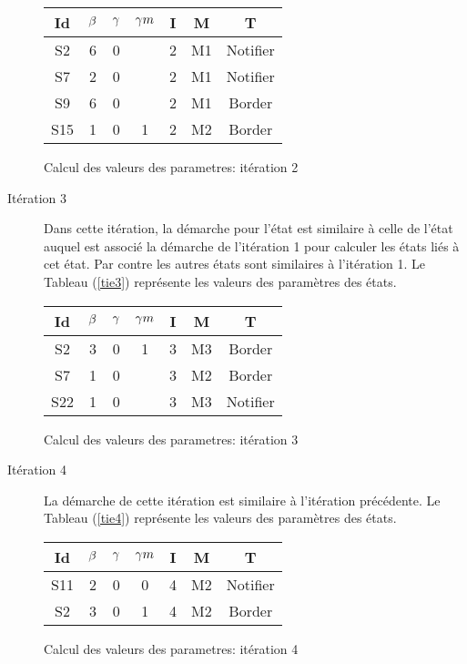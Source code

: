 \begin{Exemple}
\begin{description}
\begin{tableth}
\begin{tabular}{|*{7}{c|}}
		\hline
		Id&$\beta{}$&	$\gamma{}$	&$\gamma m{}$ &	I&	M&	T\\ \hline
		S2&		6&	0&	&	2&	M1&	Notifier\\ \hline
		S7&		2&	0&	&	2&	M1&	Notifier\\ \hline
		S9&		6&	0&	&	2&	M1&	Border\\ \hline
		S15&	1&	0&	1&	2&	M2&	Border\\ \hline		
	\end{tabular}
	\caption{Calcul des valeurs des parametres: itération 2}\label{tie2}
\end{tableth}
\item[Itération 3] Dans cette itération, la démarche pour l'état  est similaire à celle de l'état  auquel est associé la démarche de l'itération 1 pour calculer les états liés à cet état. Par contre les autres états sont similaires à l'itération 1. Le Tableau (\ref{tie3}) représente les valeurs des paramètres  des états. 
\begin{tableth}
	\centering
	\begin{tabular}{|*{7}{c|}}
		\hline
		Id&$\beta{}$&	$\gamma{}$	&$\gamma m{}$ &	I&	M&	T\\ \hline
		S2&		3&	0&	1&	3&	M3&	Border\\ \hline
		S7&		1&	0&	&	3&	M2&	Border\\ \hline
		S22&	1&	0&	&	3&	M3&	Notifier\\ \hline	
	\end{tabular}
	\caption{Calcul des valeurs des parametres: itération 3}\label{tie3}
\end{tableth}

\item[Itération 4] La démarche de cette itération est similaire à l'itération précédente. Le Tableau (\ref{tie4}) représente les valeurs des paramètres  des états.  
\begin{tableth}
	\centering
	\begin{tabular}{|*{7}{c|}}
		\hline
		Id&$\beta{}$&	$\gamma{}$	&$\gamma m{}$ &	I&	M&	T\\ \hline
		S11&	2&	0&	0&	4&	M2&	Notifier\\ \hline
		S2&		3&	0&	1&	4&	M2&	Border\\ \hline
	\end{tabular}
	\caption{Calcul des valeurs des parametres: itération 4}\label{tie4}
\end{tableth}


\end{description}
\end{Exemple}
